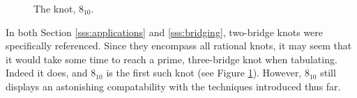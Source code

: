 \documentclass[titlepage]{article}
\begin{document}
\begin{figure}[h!]
    \centering
    \vspace{-1.5em}
    \caption{The knot, $8_{10}$.}
    \label{fig:810}
\end{figure}

In both Section \ref{sss:applications} and \ref{sss:bridging}, two-bridge knots were specifically referenced. Since they encompass all rational knots, it may seem that it would take some time to reach a prime, three-bridge knot when tabulating. Indeed it does, and $8_{10}$ is the first such knot (see Figure \ref{fig:810}). However, $8_{10}$ still displays an astonishing compatability with the techniques introduced thus far.\par
\end{document}
